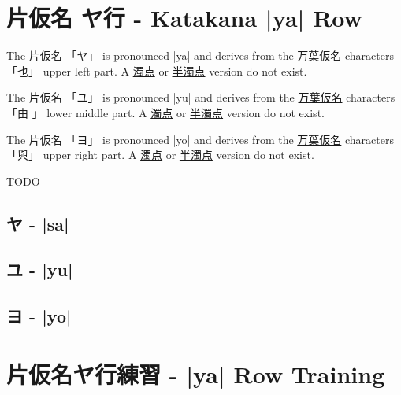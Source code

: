 \section{片仮名  ヤ行 - Katakana |ya| Row}


 The  片仮名 {「ヤ」} is pronounced  |ya| and  derives from the
\hyperref[sec:Manyogana]{万葉仮名} characters {「也」} upper left part.  A
\hyperref[sec:Dakuten]{濁点} or \hyperref[sec:Handakuten]{半濁点} version do
not exist.

 The  片仮名 {「ユ」} is pronounced  |yu| and  derives from the
\hyperref[sec:Manyogana]{万葉仮名} characters {「由 」} lower middle part.  A
\hyperref[sec:Dakuten]{濁点} or \hyperref[sec:Handakuten]{半濁点} version do
not exist.

 The  片仮名 {「ヨ」} is pronounced  |yo| and  derives from the
\hyperref[sec:Manyogana]{万葉仮名} characters {「與」} upper right part.  A
\hyperref[sec:Dakuten]{濁点} or \hyperref[sec:Handakuten]{半濁点} version do
not exist.

\newpage
TODO

\newpage

\subsection{ヤ - |sa|} \label{sec:KatakanaYa}

 

\subsection{ユ - |yu|} \label{sec:KatakanaYu}

 

\subsection{ヨ - |yo|} \label{sec:KatakanaYo}

 

\section{片仮名ヤ行練習 -   |ya| Row Training}



\newpage
{}


\newpage
